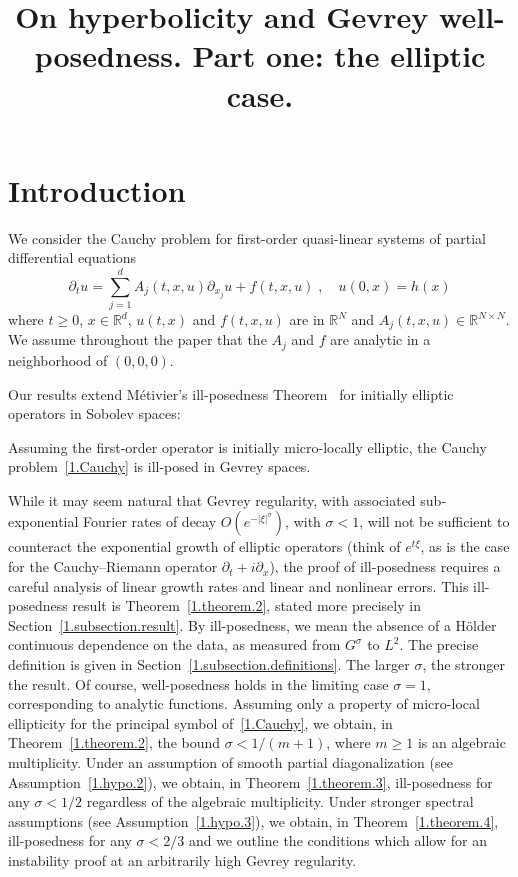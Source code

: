 \documentclass[AHL,Unicode,longabstracts,published]{cedram}
\title[On hyperbolicity and Gevrey well-posedness]{On hyperbolicity and Gevrey well-posedness. Part one: the elliptic case.}
\author{\firstname{Baptiste} \lastname{Morisse}}
\theoremstyle{plain}
\newcommand*\R{{\mathbb R}}
\newcommand{\dptl}{\partial}%
\begin{document}
\maketitle



\section{Introduction}

We consider the Cauchy problem for first-order quasi-linear systems of partial differential equations
\begin{equation}\label{1.Cauchy}
\dptl_{t}u = \sum_{j=1}^{d} A_{j}(t,x,u) \dptl_{x_j}u + f(t,x,u) \;,\quad u(0,x) = h(x)
\end{equation}
where $t\geq 0$, $x\in\R^{d}$, $u(t,x)$ and $f(t,x,u)$ are in $\R^N$ and $A_j(t,x,u)\in\R^{N\times N}$. We assume throughout the paper that the $A_j$ and $f$ are analytic in a neighborhood of $(0,0,0)$.

Our results extend Métivier's ill-posedness Theorem~\cite{metivier2005remarks} for initially elliptic operators in Sobolev spaces:
\begin{theo*}
Assuming the first-order operator is initially micro-locally elliptic, the Cauchy problem~\eqref{1.Cauchy} is ill-posed in Gevrey spaces.
\end{theo*}

While it may seem natural that Gevrey regularity, with associated sub-exponential Fourier rates of decay $O\left(e^{-|\xi|^{\sigma}} \right)$, with $\sigma <1$, will not be sufficient to counteract the exponential growth of elliptic operators (think of $e^{t\xi}$, as is the case for the Cauchy--Riemann operator $\dptl_{t} + i\dptl_{x}$), the proof of ill-posedness requires a careful analysis of linear growth rates and linear and nonlinear errors. This ill-posedness result is Theorem~\ref{1.theorem.2}, stated more precisely in Section~\ref{1.subsection.result}. By ill-posedness, we mean the absence of a H\"older continuous dependence on the data, as measured from $G^{\sigma}$ to $L^2$. The precise definition is given in Section~\ref{1.subsection.definitions}. The larger $\sigma$, the stronger the result. Of course, well-posedness holds in the limiting case $\sigma=1$, corresponding to analytic functions. Assuming only a property of micro-local ellipticity for the principal symbol of~\eqref{1.Cauchy}, we obtain, in Theorem~\ref{1.theorem.2}, the bound $\sigma < 1/(m + 1)$, where $m \geq 1$ is an algebraic multiplicity. Under an assumption of smooth partial diagonalization (see Assumption~\ref{1.hypo.2}), we obtain, in Theorem~\ref{1.theorem.3}, ill-posedness for any $\sigma <1/2$ regardless of the algebraic multiplicity. Under stronger spectral assumptions (see Assumption~\ref{1.hypo.3}), we obtain, in Theorem~\ref{1.theorem.4}, ill-posedness for any $\sigma < 2/3$ and we outline the conditions which allow for an instability proof at an arbitrarily high Gevrey regularity.
\end{document}
